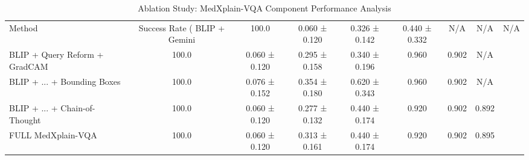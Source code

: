 \begin{table}
\caption{Ablation Study: MedXplain-VQA Component Performance Analysis}
\label{tab:medxplain_ablation}
\begin{tabular}{l|c|c|c|c|c|c|c}
\toprule
Method & Success Rate (%
\midrule
BLIP + Gemini & 100.0 & 0.060 ± 0.120 & 0.326 ± 0.142 & 0.440 ± 0.332 & N/A & N/A & N/A \\
BLIP + Query Reform + GradCAM & 100.0 & 0.060 ± 0.120 & 0.295 ± 0.158 & 0.340 ± 0.196 & 0.960 & 0.902 & N/A \\
BLIP + ... + Bounding Boxes & 100.0 & 0.076 ± 0.152 & 0.354 ± 0.180 & 0.620 ± 0.343 & 0.960 & 0.902 & N/A \\
BLIP + ... + Chain-of-Thought & 100.0 & 0.060 ± 0.120 & 0.277 ± 0.132 & 0.440 ± 0.174 & 0.920 & 0.902 & 0.892 \\
FULL MedXplain-VQA & 100.0 & 0.060 ± 0.120 & 0.313 ± 0.161 & 0.440 ± 0.174 & 0.920 & 0.902 & 0.895 \\
\bottomrule
\end{tabular}
\end{table}
